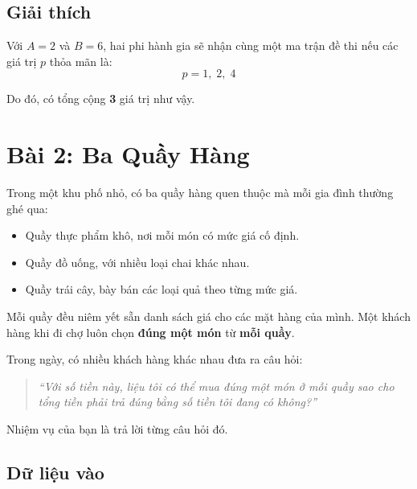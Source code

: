\bigskip

\subsection*{Giải thích}

Với $A = 2$ và $B = 6$, hai phi hành gia sẽ nhận cùng một ma trận đề thi nếu các giá trị $p$ thỏa mãn là:
\[
    p = 1,\; 2,\; 4
\]

Do đó, có tổng cộng \textbf{3} giá trị như vậy.


\bigskip

\section*{Bài 2: Ba Quầy Hàng}

Trong một khu phố nhỏ, có ba quầy hàng quen thuộc mà mỗi gia đình thường ghé qua:

\begin{itemize}
    \item Quầy thực phẩm khô, nơi mỗi món có mức giá cố định.
    \item Quầy đồ uống, với nhiều loại chai khác nhau.
    \item Quầy trái cây, bày bán các loại quả theo từng mức giá.
\end{itemize}

Mỗi quầy đều niêm yết sẵn danh sách giá cho các mặt hàng của mình.  
Một khách hàng khi đi chợ luôn chọn \textbf{đúng một món} từ \textbf{mỗi quầy}.

Trong ngày, có nhiều khách hàng khác nhau đưa ra câu hỏi:

\begin{quote}
    \emph{“Với số tiền này, liệu tôi có thể mua đúng một món ở mỗi quầy sao cho tổng tiền phải trả đúng bằng số tiền tôi đang có không?”}
\end{quote}

Nhiệm vụ của bạn là trả lời từng câu hỏi đó.

\subsection*{Dữ liệu vào}

